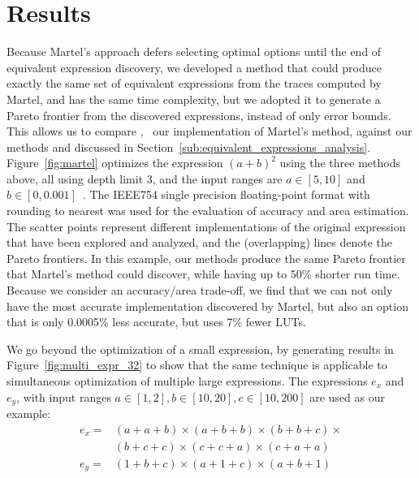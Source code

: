 \section{Results}
\label{sec:results}

Because Martel's approach defers selecting optimal options until the end of
equivalent expression discovery, we developed a method that could produce
exactly the same set of equivalent expressions from the traces computed by
Martel, and has the same time complexity, but we adopted it to generate a
Pareto frontier from the discovered expressions, instead of only error bounds.
This allows us to compare \marteltrace{}, \ie~our implementation of Martel's
method, against our methods \frontiertrace{} and \greedytrace{} discussed in
Section~\ref{sub:equivalent_expressions_analysis}. Figure~\ref{fig:martel}
optimizes the expression ${(a + b)}^2$ using the three methods above, all
using depth limit $3$, and the input ranges are $a \in [5, 10]$ and $b \in [0,
0.001]$~\cite{martel07}. The IEEE754 single precision floating-point format
with rounding to nearest was used for the evaluation of accuracy and area
estimation. The scatter points represent different implementations of the
original expression that have been explored and analyzed, and the (overlapping)
lines denote the Pareto frontiers. In this example, our methods produce the
same Pareto frontier that Martel's method could discover, while having up to
50\% shorter run time. Because we consider an accuracy/area trade-off, we
find that we can not only have the most accurate implementation discovered by
Martel, but also an option that is only 0.0005\% less accurate, but uses 7\%
fewer LUTs.

We go beyond the optimization of a small expression, by generating results in
Figure~\ref{fig:multi_expr_32} to show that the same technique is applicable to
simultaneous optimization of multiple large expressions. The expressions $e_x$
and $e_y$, with input ranges $a \in [1, 2], b \in [10, 20], c \in [10, 200]$
are used as our example:
\begin{equation}
    \begin{aligned}
    e_x =& (a + a + b) \times (a + b + b) \times (b + b + c) \times {} \\
         & (b + c + c) \times (c + c + a) \times (c + a + a) \\
    e_y =& (1 + b + c) \times (a + 1 + c) \times (a + b + 1)
    \end{aligned}
\end{equation}

